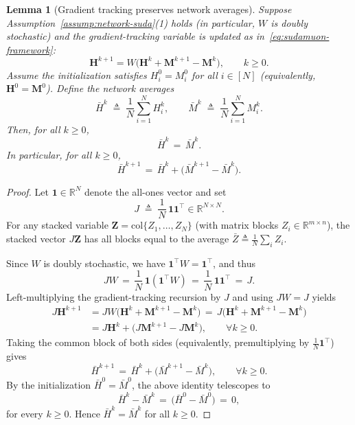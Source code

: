 \documentclass{article}
\newtheorem{lemma}{Lemma}
\begin{document}
\begin{lemma}[Gradient tracking preserves network averages]
\label{lem:sudamuon-gt-average-invariance}
Suppose Assumption~\ref{assump:network-suda}(1) holds (in particular, $W$ is doubly stochastic) and the gradient-tracking variable is updated as in~\eqref{eq:sudamuon-framework}:
\[
    \mathbf{H}^{k+1}=W\bigl(\mathbf{H}^k+\mathbf{M}^{k+1}-\mathbf{M}^k\bigr),\qquad k\ge 0.
\]
Assume the initialization satisfies $H_i^0=M_i^0$ for all $i\in[N]$ (equivalently, $\mathbf{H}^0=\mathbf{M}^0$).
Define the network averages
\[
    \bar H^k \;\triangleq\; \frac{1}{N}\sum_{i=1}^N H_i^k,\qquad
    \bar M^k \;\triangleq\; \frac{1}{N}\sum_{i=1}^N M_i^k.
\]
Then, for all $k\ge 0$,
\[
    \bar H^k \,=\, \bar M^k.
\]
In particular, for all $k\ge 0$,
\[
    \bar H^{k+1} \,=\, \bar H^k + \bigl(\bar M^{k+1}-\bar M^k\bigr).
\]
\end{lemma}
\begin{proof}
Let $\mathbf{1}\in\mathbb{R}^N$ denote the all-ones vector and set
\[
    J \;\triangleq\; \frac{1}{N}\,\mathbf{1}\mathbf{1}^\top \in\mathbb{R}^{N\times N}.
\]
For any stacked variable $\mathbf{Z}=\mathrm{col}\{Z_1,\dots,Z_N\}$ (with matrix blocks $Z_i\in\mathbb{R}^{m\times n}$), the stacked vector $J\mathbf{Z}$ has all blocks equal to the average $\bar Z\triangleq\frac{1}{N}\sum_i Z_i$.

Since $W$ is doubly stochastic, we have $\mathbf{1}^\top W=\mathbf{1}^\top$, and thus
\[
    JW 
    \,=\, \frac{1}{N}\,\mathbf{1}(\mathbf{1}^\top W)
    \,=\, \frac{1}{N}\,\mathbf{1}\mathbf{1}^\top
    \,=\, J.
\]
Left-multiplying the gradient-tracking recursion by $J$ and using $JW=J$ yields
\[
\begin{aligned}
    J\mathbf{H}^{k+1}
    &= JW\bigl(\mathbf{H}^k+\mathbf{M}^{k+1}-\mathbf{M}^k\bigr)
     \,=\, J\bigl(\mathbf{H}^k+\mathbf{M}^{k+1}-\mathbf{M}^k\bigr) \\
    &= J\mathbf{H}^k + \bigl(J\mathbf{M}^{k+1}-J\mathbf{M}^k\bigr),\qquad \forall k\ge 0.
\end{aligned}
\]
Taking the common block of both sides (equivalently, premultiplying by $\tfrac{1}{N}\mathbf{1}^\top$) gives
\[
    \bar H^{k+1} \,=\, \bar H^k + \bigl(\bar M^{k+1}-\bar M^k\bigr),\qquad \forall k\ge 0.
\]
By the initialization $\bar H^0=\bar M^0$, the above identity telescopes to
\[
    \bar H^k - \bar M^k 
    \,=\, \bigl(\bar H^0-\bar M^0\bigr) \,=\, 0,
\]
for every $k\ge 0$. Hence $\bar H^k=\bar M^k$ for all $k\ge 0$.
\end{proof}
\end{document}
